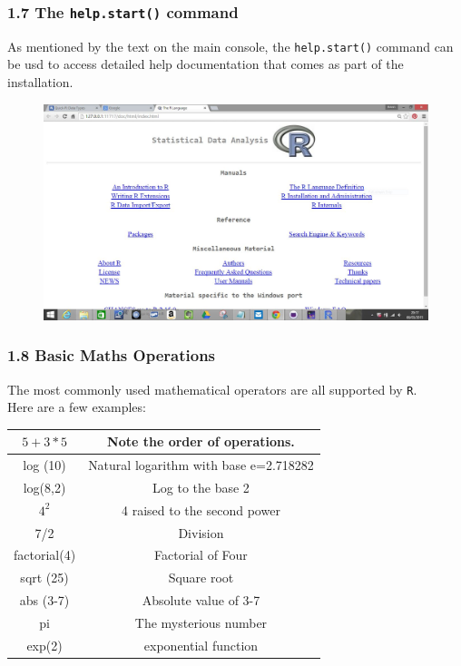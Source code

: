 \documentclass{beamer}
\begin{document}
 	
 
 	\begin{frame}
 		
 		
 		\frametitle{1.7 The \texttt{help.start()} command}
 		As mentioned by the text on the main console, the \texttt{help.start()} command can be usd to
 		access detailed help documentation that comes as part of the installation.
 	\end{frame}
 	
 	\begin{frame}\begin{figure}
\centering
\includegraphics[width=1.2\linewidth]{images/helpstart}

\end{figure}
\end{frame}
 	\begin{frame}
 		
 		\frametitle{1.8 Basic Maths Operations}
 		\vspace{-0.5cm}
 		The most commonly used mathematical operators are all supported by \texttt{R}. \\ \bigskip Here are a few
 		examples:
 		\begin{tabular}{|c|c|} \hline
 			$5 + 3 \ast 5$ &  Note the order of operations.\\\hline
 			log (10) & Natural logarithm with base e=2.718282 \\\hline
 			log(8,2) & Log to the base 2 \\\hline
 			$4^2$ & 4 raised to the second power \\\hline
 			7/2 & Division \\\hline
 			factorial(4) & Factorial of Four \\\hline
 			sqrt (25) & Square root \\\hline
 			abs (3-7) & Absolute value of 3-7 \\\hline
 			pi & The mysterious number \\\hline
 			exp(2) & exponential function \\\hline
 			
 		\end{tabular} 
 	\end{frame}
 	
\end{document}
